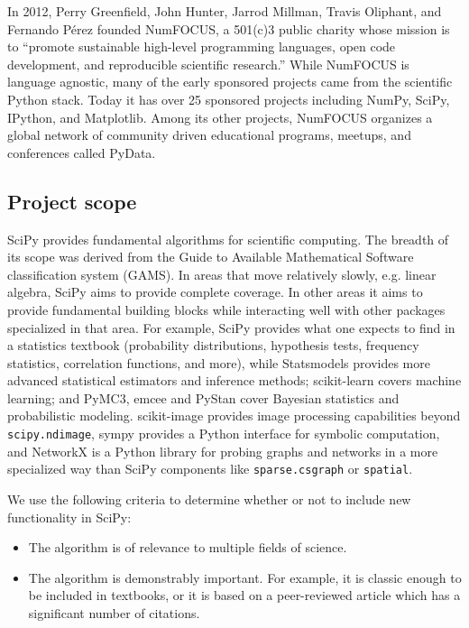 \documentclass[fleqn,10pt]{wlscirep}
\begin{document}
In 2012, Perry Greenfield, John Hunter, Jarrod Millman, Travis Oliphant,
and Fernando Pérez founded NumFOCUS\cite{numfocus},
 a 501(c)3 public charity whose mission is to
``promote sustainable high-level programming languages, open code development,
and reproducible scientific research.''
While NumFOCUS is language agnostic, many of the early sponsored projects
came from the scientific Python stack.
Today it has over 25 sponsored projects including NumPy, SciPy, IPython, and
Matplotlib.
Among its other projects, NumFOCUS organizes a global network of 
community driven educational programs, meetups, and conferences
called PyData.

\subsection*{Project scope}

SciPy provides fundamental algorithms for scientific computing. The
breadth of its scope was derived from the Guide to Available Mathematical
Software classification system (GAMS\cite{boisvert1991guide}). In areas
that move relatively slowly, e.g. linear algebra, SciPy aims to provide
complete coverage. In other areas it aims to provide fundamental building
blocks while interacting well with other packages specialized in that area.
For example, SciPy provides what one expects to find in a
statistics textbook (probability distributions, hypothesis tests, frequency
statistics, correlation functions, and more), while 
Statsmodels\cite{statsmodels2010} provides
more advanced statistical estimators and inference methods;
scikit-learn\cite{pedregosa2011scikit} covers machine learning; and
PyMC3\cite{10.7717/peerj-cs.55}, emcee\cite{2013PASP-emcee} and 
PyStan\cite{pystan-ref} cover Bayesian statistics and probabilistic modeling.
scikit-image\cite{vanderwalt2014scikit} provides image processing
capabilities beyond \texttt{scipy.ndimage}, sympy\cite{meurer2017sympy}
provides a Python interface for symbolic computation, and
NetworkX\cite{hagberg2008networkx} is a Python library for probing
graphs and networks in a more specialized way than SciPy components
like \texttt{sparse.csgraph} or \texttt{spatial}.

We use the following criteria to determine whether or not to include new
functionality in SciPy:
\begin{itemize}
    \item The algorithm is of relevance to multiple fields of science.
    \item The algorithm is demonstrably important.  For example, it is classic
    enough to be included in textbooks, or it is based on a peer-reviewed article
    which has a significant number of citations.
\end{itemize}
\end{document}
